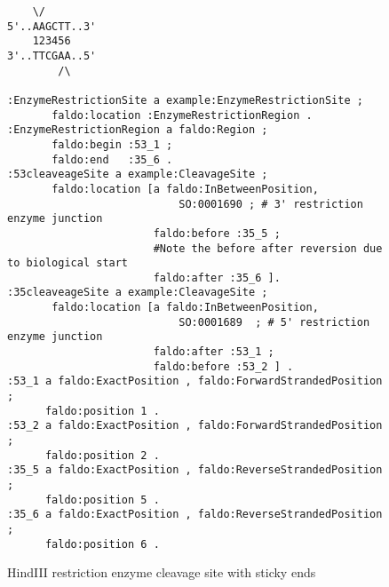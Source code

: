 \begin{figure}
\begin{shaded}
\small
\begin{verbatim}
    \/
5'..AAGCTT..3' 
    123456
3'..TTCGAA..5'
        /\
        
:EnzymeRestrictionSite a example:EnzymeRestrictionSite ;
       faldo:location :EnzymeRestrictionRegion .
:EnzymeRestrictionRegion a faldo:Region ;
       faldo:begin :53_1 ;
       faldo:end   :35_6 .
:53cleaveageSite a example:CleavageSite ;
       faldo:location [a faldo:InBetweenPosition, 
                           SO:0001690 ; # 3' restriction enzyme junction 
                       faldo:before :35_5 ;
                       #Note the before after reversion due to biological start      
                       faldo:after :35_6 ]. 
:35cleaveageSite a example:CleavageSite ;
       faldo:location [a faldo:InBetweenPosition, 
                           SO:0001689  ; # 5' restriction enzyme junction 
                       faldo:after :53_1 ;        
                       faldo:before :53_2 ] .
:53_1 a faldo:ExactPosition , faldo:ForwardStrandedPosition ;
      faldo:position 1 .
:53_2 a faldo:ExactPosition , faldo:ForwardStrandedPosition ;
      faldo:position 2 .
:35_5 a faldo:ExactPosition , faldo:ReverseStrandedPosition ;
      faldo:position 5 .
:35_6 a faldo:ExactPosition , faldo:ReverseStrandedPosition ;
      faldo:position 6 .
\end{verbatim}
\end{shaded}
\caption{HindIII restriction enzyme cleavage site with sticky ends}
\label{fig:HindIII}
\end{figure}




